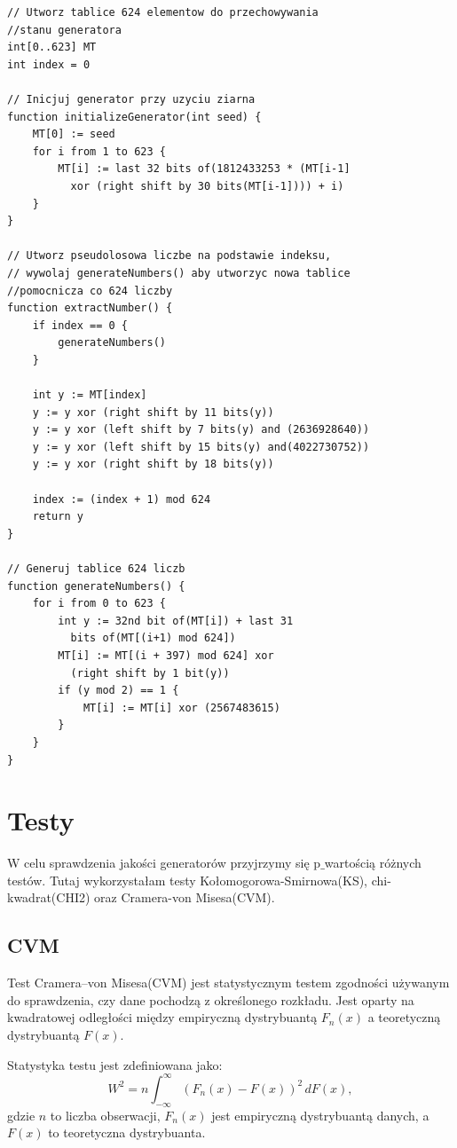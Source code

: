 \documentclass[12pt]{mwart}\usepackage[]{graphicx}\usepackage[]{xcolor}
\begin{document}
\begin{lstlisting}
// Utworz tablice 624 elementow do przechowywania 
//stanu generatora
int[0..623] MT
int index = 0

// Inicjuj generator przy uzyciu ziarna
function initializeGenerator(int seed) {
    MT[0] := seed
    for i from 1 to 623 {
        MT[i] := last 32 bits of(1812433253 * (MT[i-1] 
          xor (right shift by 30 bits(MT[i-1]))) + i) 
    }
}

// Utworz pseudolosowa liczbe na podstawie indeksu,
// wywolaj generateNumbers() aby utworzyc nowa tablice 
//pomocnicza co 624 liczby
function extractNumber() {
    if index == 0 {
        generateNumbers()
    }
    
    int y := MT[index]
    y := y xor (right shift by 11 bits(y))
    y := y xor (left shift by 7 bits(y) and (2636928640)) 
    y := y xor (left shift by 15 bits(y) and(4022730752)) 
    y := y xor (right shift by 18 bits(y))
    
    index := (index + 1) mod 624
    return y
}

// Generuj tablice 624 liczb
function generateNumbers() {
    for i from 0 to 623 {
        int y := 32nd bit of(MT[i]) + last 31 
          bits of(MT[(i+1) mod 624])
        MT[i] := MT[(i + 397) mod 624] xor 
          (right shift by 1 bit(y))
        if (y mod 2) == 1 { 
            MT[i] := MT[i] xor (2567483615)
        }
    }
}
\end{lstlisting}

\section*{Testy}
W celu sprawdzenia jakości generatorów przyjrzymy się p$\_$wartością różnych testów. Tutaj wykorzystałam testy Kołomogorowa-Smirnowa(KS), \newline chi-kwadrat(CHI2) oraz Cramera-von Misesa(CVM). 

\subsection*{CVM}
Test Cramera–von Misesa(CVM) jest statystycznym testem zgodności używanym do sprawdzenia, czy dane pochodzą z określonego rozkładu. Jest oparty na kwadratowej odległości między empiryczną dystrybuantą \( F_n(x) \) a teoretyczną dystrybuantą \( F(x) \).

Statystyka testu jest zdefiniowana jako:
\[
W^2 = n \int_{-\infty}^\infty \left( F_n(x) - F(x) \right)^2 \, dF(x),
\]
gdzie \( n \) to liczba obserwacji, \( F_n(x) \) jest empiryczną dystrybuantą danych, a \( F(x) \) to teoretyczna dystrybuanta.
\end{document}
